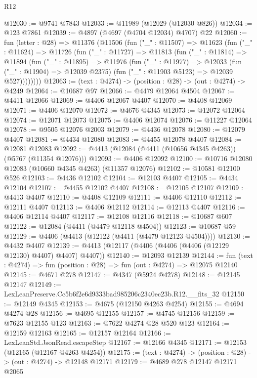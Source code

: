 \begin{lexlean}{R12}
\begin{coremodule}
@12030 := @9741 @7843
@12033 := @11989 (@12029 (@12030 @826))
@12034 := @123 @7861
@12039 := @4897 (@4697 (@4704 @12034) @4707) @22
@12060 := fun (letter : @28) =>
  @11376
    (@11506
      (fun ("_" : @11507) =>
      @11623
        (fun ("_" : @11624) =>
        @11726
          (fun ("_" : @11727) =>
          @11813
            (fun ("_" : @11814) =>
            @11894
              (fun ("_" : @11895) =>
              @11976
                (fun ("_" : @11977) =>
                @12033
                  (fun ("_" : @11904) => @12039 @2375)
                  (fun ("_" : @11903 @5123) => @12039 @527))))))))
@12063 := (text : @4274) -> (position : @28) -> (out : @4274) -> @4249
@12064 := @10687 @97
@12066 := @4479 @12064 @4504
@12067 := @4411 @12066
@12069 := @4406 @12067 @4407
@12070 := @4408 @12069
@12071 := @4406 @12070
@12072 := @4676 @4345
@12073 := @12072 @12064
@12074 := @12071 @12073
@12075 := @4406 @12074
@12076 := @11227 @12064
@12078 := @9505 @12076 @2003
@12079 := @4436 @12078
@12080 := @12079 @4407
@12081 := @4434 @12080
@12083 := @4455 @12078 @4407
@12084 := @12081 @12083
@12092 := @4413 (@12084 (@4411 (@10656 @4345 @4263)) (@5767 (@11354 @12076)))
@12093 := @4406 @12092
@12100 := @10716 @12080 @12083 (@10660 @4345 @4263) (@11357 @12076)
@12102 := @10581 @12100 @526
@12103 := @4436 @12102
@12104 := @12103 @4407
@12105 := @4434 @12104
@12107 := @4455 @12102 @4407
@12108 := @12105 @12107
@12109 := @4413 @4407
@12110 := @4408 @12109
@12111 := @4406 @12110
@12112 := @12111 @4407
@12113 := @4406 @12112
@12114 := @12113 @4407
@12116 := @4406 @12114 @4407
@12117 := @12108 @12116
@12118 := @10687 @607
@12122 := @12084 (@4411 (@4479 @12118 @4504))
@12123 := @10687 @59
@12129 := @4406 (@4413 (@12122 (@4411 (@4479 @12123 @4504))))
@12130 := @4432 @4407
@12139 := @4413 (@12117 (@4406 (@4406 (@4406 (@12129 @12130) @4407) @4407) @4407))
@12140 := @12093 @12139
@12144 := fun (text : @4274) => fun (position : @28) => fun (out : @4274) => @12075 @12140
@12145 := @4671 @278
@12147 := @4347 (@5924 @4278)
@12148 := @12145 @12147
@12149 := LexLeanPreserve.Cc5b6f2e6d9333bad985206c2340ec23b.R12.__fits_32
@12150 := @12149 @4345
@12153 := @4675 (@12150 @4263 @4254)
@12155 := @4694 @4274 @28
@12156 := @4695 @12155
@12157 := @4745 @12156
@12159 := @7623 @12155 @123
@12163 := @7622 @4274 @28 @520 @123
@12164 := @12159 @12163
@12165 := @12157 @12164
@12166 := LexLeanStd.JsonRead.escapeStep
@12167 := @12166 @4345
@12171 := @12153 (@12165 (@12167 @4263 @4254))
@12175 := (text : @4274) -> (position : @28) -> (out : @4274) -> @12148 @12171
@12179 := @4689 @278 @12147 @12171 @2065

\end{coremodule}
\end{lexlean}
